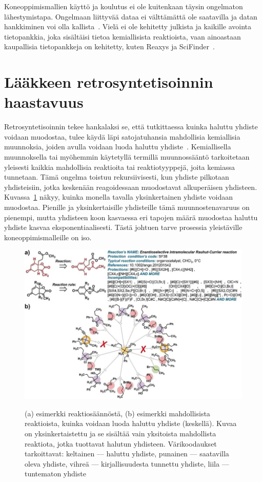 \documentclass[finnish,twoside,censored,tkt,sw-line]{HYthesisML}
\begin{document}
Koneoppimismallien käyttö ja koulutus ei ole kuitenkaan täysin ongelmaton lähestymistapa.
Ongelmaan liittyvää dataa ei välttämättä ole saatavilla ja datan hankkiminen voi olla kallista~\cite{deAlmeidaA.Filipa2019Socd}.
Vielä ei ole kehitetty julkista ja kaikille avointa tietopankkia, joka sisältäisi tietoa kemiallisista reaktioista, vaan ainoastaan kaupallisia tietopankkeja on kehitetty, kuten Reaxys ja SciFinder~\cite{deAlmeidaA.Filipa2019Socd}.

\section{Lääkkeen retrosyntetisoinnin haastavuus}

Retrosyntetisoinnin tekee hankalaksi se, että tutkittaessa kuinka haluttu yhdiste voidaan muodostaa, tulee käydä läpi satojatuhansia mahdollisia kemiallisia muunnoksia, joiden avulla voidaan luoda haluttu yhdiste~\cite{SeglerMarwinHS2018Pcsw}.
Kemiallisella muunnoksella tai myöhemmin käytetyllä termillä muunnossääntö tarkoitetaan yleisesti kaikkia mahdollisia reaktioita tai reaktiotyyppejä, joita kemiassa tunnetaan.
Tämä ongelma toistuu rekursiivisesti, kun yhdiste pilkotaan yhdisteisiin, jotka keskenään reagoidessaan muodostavat alkuperäisen yhdisteen.
Kuvassa~\ref{fig:retrosynthesis-example} näkyy, kuinka monella tavalla yksinkertainen yhdiste voidaan muodostaa.
Pienille ja yksinkertaisille yhdisteille tämä muunnostenavaruus on pienempi, mutta yhdisteen koon kasvaessa eri tapojen määrä muodostaa haluttu yhdiste kasvaa eksponentiaalisesti.
Tästä johtuen tarve prosessia yleistäville koneoppimismalleille on iso.

\begin{figure}[!ht]
    \centering
    \includegraphics[width=\textwidth]{retrosynthesis.jpg}
    \caption{(a) esimerkki reaktiosäännöstä, (b) esimerkki mahdollisista reaktioista, kuinka voidaan luoda haluttu yhdiste (keskellä).
        Kuvaa on yksinkertaistettu ja se sisältää vain yksitoista mahdollista reaktiota, jotka tuottavat halutun yhdisteen.
        Värikoodaukset tarkoittavat: keltainen --- haluttu yhdiste, punainen --- saatavilla oleva yhdiste, vihreä --- kirjallisuudesta tunnettu yhdiste, liila --- tuntematon yhdiste}
    {\cite{ExpertKnowledgeRetorsynthesis}}
    {\label{fig:retrosynthesis-example}}
\end{figure}
\end{document}
